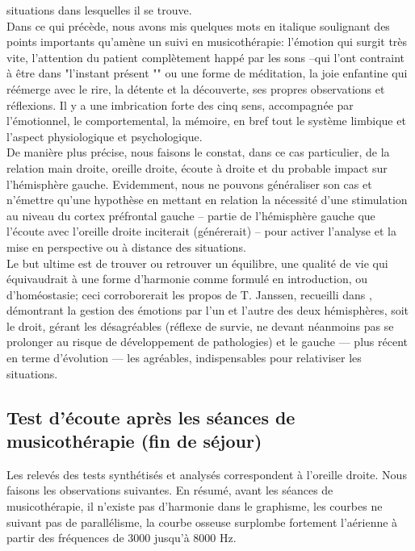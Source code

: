 situations dans lesquelles il se trouve.
\\
Dans ce qui précède, nous avons mis quelques mots en italique soulignant des  points
importants qu'amè\-ne un suivi en musicothérapie: l'émotion qui surgit très
vite,
l'attention du patient complètement happé par les sons --qui l'ont
contraint à être dans "l'instant présent "" ou une forme de méditation, la joie
enfantine qui réémerge avec le rire, la détente et la découverte,
ses propres observations et réflexions.
Il y a une imbrication forte des cinq sens, accompagnée par l'émotionnel, le comportemental, la
mémoire, en bref tout le système limbique et l'aspect
physiologique et psychologique.
\\
De manière plus précise, nous faisons le constat, dans ce cas
particulier,  de la relation main droite, oreille droite, écoute
à droite et du probable impact sur l'hémisphère gauche.
Evidemment, nous ne pouvons généraliser son cas et 
n'émettre qu'une hypothèse
en mettant en relation la nécessité d'une stimulation au niveau du cortex préfrontal
gauche -- partie de l'hémisphère gauche que l'écoute avec
l'oreille droite inciterait (générerait) -- pour activer l'analyse et la
mise en perspective ou à distance des situations.
\\
Le but ultime est de trouver ou
retrouver un équilibre, une qualité de vie qui équivaudrait à une forme d'harmonie comme formulé en 
introduction, ou d'homéostasie;  ceci
corroborerait les
propos de T. Janssen, recueilli dans  \autocite {van_eersel_cerveau}, démontrant la gestion des 
émotions par
l'un et l'autre des deux hémisphères, soit le droit,  gérant les désagréables
(réflexe de survie, ne devant néanmoins pas se prolonger au risque de
développement de pathologies)
et  le gauche --- plus récent en terme d'évolution ---  les
agréables, indispensables pour relativiser les situations.

\subsection{ Test d'écoute après les séances de musicothérapie (fin de séjour)}


Les relevés des tests synthétisés et analysés correspondent à l'oreille droite.
Nous faisons les observations suivantes.
En résumé, avant les séances de musicothérapie, il n'existe pas d'harmonie dans le graphisme, les 
courbes ne suivant pas de 
parallélisme, la courbe osseuse  surplombe fortement l'aérienne 
à partir des fréquences de 3000 jusqu'à 8000 Hz.

